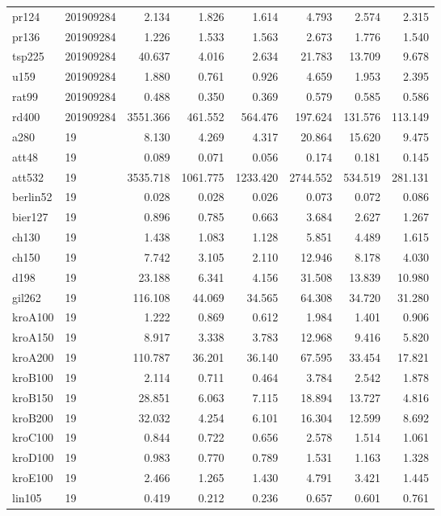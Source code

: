 \begin{center}
\begin{longtable}{llrrrrrr}
pr124 & 201909284 & 2.134 & 1.826 & 1.614 & 4.793 & 2.574 & 2.315\\
pr136 & 201909284 & 1.226 & 1.533 & 1.563 & 2.673 & 1.776 & 1.540\\
tsp225 & 201909284 & 40.637 & 4.016 & 2.634 & 21.783 & 13.709 & 9.678\\
u159 & 201909284  & 1.880 & 0.761 & 0.926 & 4.659 & 1.953 & 2.395\\
rat99 & 201909284 & 0.488 & 0.350 & 0.369 & 0.579 & 0.585 & 0.586\\
rd400 & 201909284 & 3551.366 & 461.552 & 564.476 & 197.624 & 131.576 & 113.149\\
a280 & 19 & 8.130 & 4.269 & 4.317 & 20.864 & 15.620 & 9.475\\
att48  & 19 & 0.089 & 0.071 & 0.056 & 0.174 & 0.181 & 0.145\\
att532  & 19 & 3535.718 & 1061.775 & 1233.420 & 2744.552 & 534.519 & 281.131\\
berlin52  & 19 & 0.028 & 0.028 & 0.026 & 0.073 & 0.072 & 0.086\\
bier127  & 19 & 0.896 & 0.785 & 0.663 & 3.684 & 2.627 & 1.267\\
ch130  & 19 & 1.438 & 1.083 & 1.128 & 5.851 & 4.489 & 1.615\\
ch150  & 19 & 7.742 & 3.105 & 2.110 & 12.946 & 8.178 & 4.030\\
d198  & 19 & 23.188 & 6.341 & 4.156 & 31.508 & 13.839 & 10.980\\
gil262  & 19 & 116.108 & 44.069 & 34.565 & 64.308 & 34.720 & 31.280\\
kroA100  & 19 & 1.222 & 0.869 & 0.612 & 1.984 & 1.401 & 0.906\\
kroA150  & 19 & 8.917 & 3.338 & 3.783 & 12.968 & 9.416 & 5.820\\
kroA200  & 19 & 110.787 & 36.201 & 36.140 & 67.595 & 33.454 & 17.821\\
kroB100  & 19 & 2.114 & 0.711 & 0.464 & 3.784 & 2.542 & 1.878\\
kroB150 & 19 & 28.851 & 6.063 & 7.115 & 18.894 & 13.727 & 4.816\\
kroB200  & 19 & 32.032 & 4.254 & 6.101 & 16.304 & 12.599 & 8.692\\
kroC100  & 19 & 0.844 & 0.722 & 0.656 & 2.578 & 1.514 & 1.061\\
kroD100  & 19 & 0.983 & 0.770 & 0.789 & 1.531 & 1.163 & 1.328\\
kroE100  & 19 & 2.466 & 1.265 & 1.430 & 4.791 & 3.421 & 1.445\\
lin105  & 19 & 0.419 & 0.212 & 0.236 & 0.657 & 0.601 & 0.761\\

\end{longtable}
\end{center}
